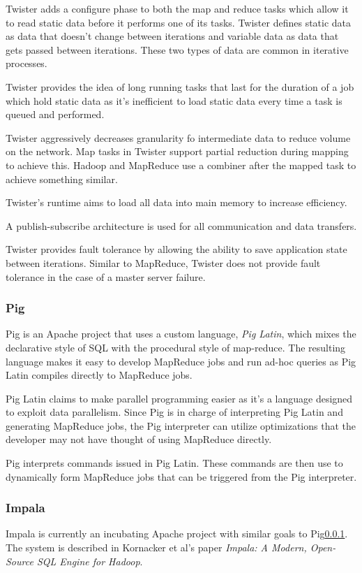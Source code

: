 \documentclass[]{article}
\begin{document}
Twister adds a configure phase to both the map and reduce tasks which allow it to read static data before it performs one of its tasks. Twister defines static data as data that doesn't change between iterations and variable data as data that gets passed between iterations. These two types of data are common in iterative processes.

Twister provides the idea of long running tasks that last for the duration of a job which hold static data as it's inefficient to load static data every time a task is queued and performed.

Twister aggressively decreases granularity fo intermediate data to reduce volume on the network. Map tasks in Twister support partial reduction during mapping to achieve this. Hadoop and MapReduce use a combiner after the mapped task to achieve something similar.

Twister's runtime aims to load all data into main memory to increase efficiency.

A publish-subscribe architecture is used for all communication and data transfers.

Twister provides fault tolerance by allowing the ability to save application state between iterations. Similar to MapReduce, Twister does not provide fault tolerance in the case of a master server failure.

\subsubsection{Pig}\label{sssec:pig}
Pig\cite{olston2008pig} is an Apache project that uses a custom language, \textit{Pig Latin}, which mixes the declarative style of SQL with the procedural style of map-reduce. The resulting language makes it easy to develop MapReduce jobs and run ad-hoc queries as Pig Latin compiles directly to MapReduce jobs.

Pig Latin claims to make parallel programming easier as it's a language designed to exploit data parallelism. Since Pig is in charge of interpreting Pig Latin and generating MapReduce jobs, the Pig interpreter can utilize optimizations that the developer may not have thought of using MapReduce directly.

Pig interprets commands issued in Pig Latin. These commands are then use to dynamically form MapReduce jobs that can be triggered from the Pig interpreter.

\subsubsection{Impala}\label{sssec:impala}
Impala\cite{impala} is currently an incubating Apache project with similar goals to Pig\ref{sssec:pig}. The system is described in Kornacker et al's paper \textit{Impala: A Modern, Open-Source SQL Engine for Hadoop}\cite{kornacker2015impala}.
\end{document}
